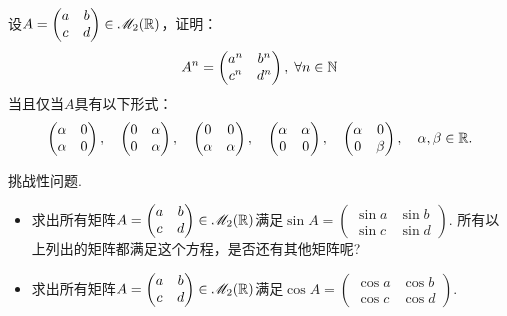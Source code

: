 \begin{mybox}
  \begin{problem}
    设$A=\begin{pmatrix}
      a & b \\
      c & d
    \end{pmatrix}\in\mathscr M_2(\mathbb R)$，证明：
    \[
      A^n = \begin{pmatrix}
        a^n & b^n \\
        c^n & d^n
      \end{pmatrix},\; \forall n\in\mathbb N
    \]
    当且仅当$A$具有以下形式：
    \[
      \begin{pmatrix}
        \alpha & 0 \\
        \alpha & 0
      \end{pmatrix},\quad
      \begin{pmatrix}
        0 & \alpha \\
        0 & \alpha
      \end{pmatrix},\quad
      \begin{pmatrix}
        0 & 0 \\
        \alpha & \alpha
      \end{pmatrix}, \quad
      \begin{pmatrix}
        \alpha & \alpha \\
        0 & 0
      \end{pmatrix},\quad
      \begin{pmatrix}
        \alpha & 0 \\
        0 & \beta
      \end{pmatrix},\quad
      \alpha,\beta\in\mathbb R.
    \]

    {\kaishu 挑战性问题.}
    \begin{itemize}
      \item 求出所有矩阵$A=\begin{pmatrix}
        a & b \\
        c & d
      \end{pmatrix}\in\mathscr M_2(\mathbb R)$满足$\sin A=\begin{pmatrix}
        \sin a & \sin b\\
        \sin c & \sin d
      \end{pmatrix}$. 所有以上列出的矩阵都满足这个方程，是否还有其他矩阵呢?
      \item 求出所有矩阵$A=\begin{pmatrix}
        a & b \\
        c & d
      \end{pmatrix}\in\mathscr M_2(\mathbb R)$满足$\cos A=\begin{pmatrix}
        \cos a & \cos b \\
        \cos c & \cos d
      \end{pmatrix}$.
    \end{itemize}
  \end{problem}
\end{mybox}


